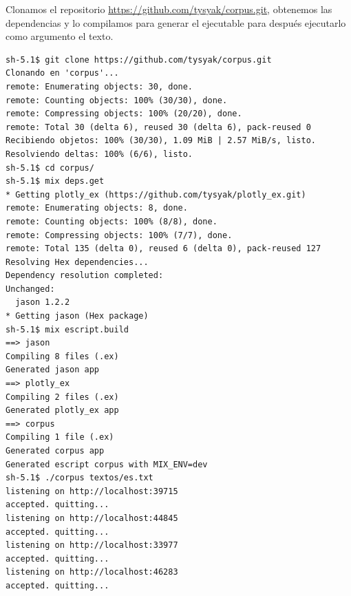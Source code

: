 \documentclass{IEEEtran}
\begin{document}
Clonamos el repositorio \url{https://github.com/tysyak/corpus.git}, obtenemos las
dependencias y lo compilamos para generar el ejecutable para después
ejecutarlo como argumento el texto.
\begin{verbatim}
sh-5.1$ git clone https://github.com/tysyak/corpus.git
Clonando en 'corpus'...
remote: Enumerating objects: 30, done.
remote: Counting objects: 100% (30/30), done.
remote: Compressing objects: 100% (20/20), done.
remote: Total 30 (delta 6), reused 30 (delta 6), pack-reused 0
Recibiendo objetos: 100% (30/30), 1.09 MiB | 2.57 MiB/s, listo.
Resolviendo deltas: 100% (6/6), listo.
sh-5.1$ cd corpus/
sh-5.1$ mix deps.get
* Getting plotly_ex (https://github.com/tysyak/plotly_ex.git)
remote: Enumerating objects: 8, done.
remote: Counting objects: 100% (8/8), done.
remote: Compressing objects: 100% (7/7), done.
remote: Total 135 (delta 0), reused 6 (delta 0), pack-reused 127
Resolving Hex dependencies...
Dependency resolution completed:
Unchanged:
  jason 1.2.2
* Getting jason (Hex package)
sh-5.1$ mix escript.build
==> jason
Compiling 8 files (.ex)
Generated jason app
==> plotly_ex
Compiling 2 files (.ex)
Generated plotly_ex app
==> corpus
Compiling 1 file (.ex)
Generated corpus app
Generated escript corpus with MIX_ENV=dev
sh-5.1$ ./corpus textos/es.txt
listening on http://localhost:39715
accepted. quitting...
listening on http://localhost:44845
accepted. quitting...
listening on http://localhost:33977
accepted. quitting...
listening on http://localhost:46283
accepted. quitting...
\end{verbatim}
\end{document}
